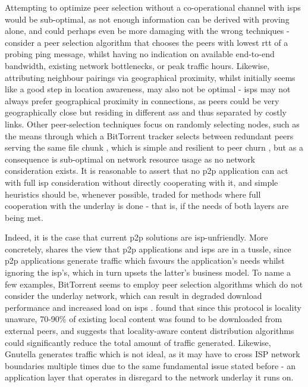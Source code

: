     Attempting to optimize peer selection without a co-operational channel with \glspl{isp} would be sub-optimal, as not enough information can be derived with proving alone, and could perhaps even be more damaging with the wrong techniques - consider a peer selection algorithm that chooses the peers with lowest \gls{rtt} of a probing ping message, whilst having no indication on available end-to-end bandwidth, existing network bottlenecks, or peak traffic hours.
    Likewise, attributing neighbour pairings via geographical proximity, whilst initially seems like a good step in location awareness, may also not be optimal - \glspl{isp} may not always prefer geographical proximity in connections, as peers could be very geographically close but residing in different \glspl{as} and thus separated by costly links.
    Other peer-selection techniques focus on randomly selecting nodes, such as the means through which a BitTorrent tracker selects between redundant peers serving the same file chunk \cite{bittorrent-details}, which is simple and resilient to peer churn \cite{qin2009}, but as a consequence is sub-optimal on network resource usage as no network consideration exists.
    It is reasonable to assert that no \gls{p2p} application can act with full \gls{isp} consideration without directly cooperating with it, and simple heuristics should be, whenever possible, traded for methods where full cooperation with the underlay is done - that is, if the needs of both layers are being met.

    Indeed, it is the case that current \gls{p2p} solutions are \gls{isp}-unfriendly.
    More concretely, \cite{isp-p2p-tussle} shares the view that \gls{p2p} applications and \glspl{isp} are in a tussle, since \gls{p2p} applications generate traffic which favours the application's needs whilst ignoring the \gls{isp}'s, which in turn upsets the latter's business model.
    To name a few examples, BitTorrent seems to employ peer selection algorithms which do not consider the underlay network, which can result in degraded download performance and increased load on \glspl{isp} \cite{qin2009}.
    \cite{karagiannis} found that since this protocol is locality unaware, 70-90\% of existing local content was found to be downloaded from external peers, and suggests that locality-aware content distribution algorithms could significantly reduce the total amount of traffic generated.
    Likewise, Gnutella generates traffic which is not ideal, as it may have to cross ISP network boundaries multiple times \cite{estimating-gnutella} due to the same fundamental issue stated before - an application layer that operates in disregard to the network underlay it runs on.

